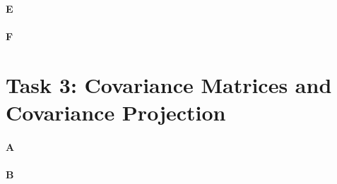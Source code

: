 \documentclass[12pt]{article}
\begin{document}
\paragraph{E}

\paragraph{F}

\section{Task 3: Covariance Matrices and Covariance Projection}

\paragraph{A}

\paragraph{B}
\end{document}

